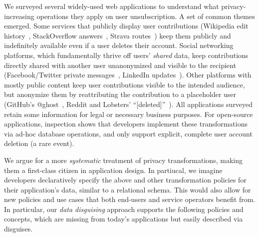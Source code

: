 %
We surveyed several widely-used web applications to understand what privacy-increasing operations
they apply on user unsubscription.
%
A set of common themes emerged.
%
Some services that publicly display user contributions (\eg Wikipedia edit
history~\cite{wikipedia:privacy}, StackOverflow answers~\cite{stackoverflow:privacy},
Strava routes~\cite{strava:privacy}) keep them publicly and indefinitely available even if a user deletes
their account.
%
Social networking platforms, which fundamentally thrive off users' \emph{shared} data, keep
contributions directly shared with another user unanonymized and visible to the recipient
(\eg Facebook/Twitter private messages~\cite{facebook:privacy, twitter:privacy},
LinkedIn updates~\cite{linkedin:privacy}).
%
Other platforms with mostly public content keep user contributions visible to the intended audience,
but anonymize them by reattributing the contribution to a placeholder user (\eg GitHub's
@ghost~\cite{github:privacy}, Reddit and Lobsters'
``[deleted]''~\cite{reddit:privacy, lobsters:privacy}).
%
%
All applications surveyed retain some information for legal or necessary business
purposes.
%
For open-source applications, inspection shows that developers implement these transformations
via ad-hoc database operations, and only support explicit, complete user account deletion (a
rare event).
%

%
We argue for a more \emph{systematic} treatment of privacy transformations, making them a
first-class citizen in application design.
%
In partiucal, we imagine developers declaratively specify the above and other transformation
policies for their application's data, similar to a relational schema.
%
This would also allow for new policies and use cases that both end-users and service operators
benefit from.
%
In particular, our \emph{data disguising} approach supports the following policies and concepts,
which are missing from today's applications but easily described via disguises.
%

